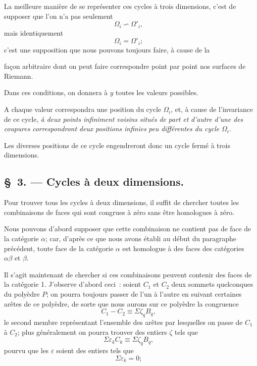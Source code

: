 \documentclass{article}
\begin{document}
La meilleure manière de se représenter ces cycles à trois dimensions, c'est de supposer que l'on n'a pas seulement
\[ \Omega_{i} \backsim \Omega'_{i}, \]
mais identiquement
\[ \Omega_{i} = \Omega'_{i}; \]
c'est une supposition que nous pouvons toujours faire, à cause de la

façon arbitraire dont on peut faire correspondre point par point nos surfaces de Riemann.

Dans ces conditions, on donnera à $y$ toutes les valeurs possibles.

A chaque valeur correspondra une position du cycle $\Omega_{i}$, et, à cause de l'invariance de ce cycle, \emph{à deux points infiniment voisins situés de part et d'autre d'une des coupures correspondront deux positions infinies} \emph{peu différentes du cycle $\Omega_{i}$}.

Les diverses positions de ce cycle engendreront donc un cycle fermé à trois dimensions.

\subsection*{\S~3. --- Cycles à deux dimensions.}

Pour trouver tous les cycles à deux dimensions, il suffit de chercher toutes les combinaisons de faces qui sont congrues à zéro sans être homologues à zéro.

Nous pouvons d'abord supposer que cette combinaison ne contient pas de face de la catégorie $\alpha$; car, d'après ce que nous avons établi au début du paragraphe précédent, toute face de la catégorie $\alpha$ est homologue à des faces des catégories $\alpha\beta$ et $\beta$.

Il s'agit maintenant de chercher si ces combinaisons peuvent contenir des faces de la catégorie 1. J'observe d'abord ceci~: soient $C_{1}$ et $C_{2}$ deux sommets quelconques du polyèdre $P$; on pourra toujours passer de l'un à l'autre en suivant certaines arêtes de ce polyèdre, de sorte que nous aurons sur ce polyèdre la congruence
\[ C_{1} - C_{2} \equiv \Sigma \zeta_{q} B_{q}, \]
le second membre représentant l'ensemble des arêtes par lesquelles on passe de $C_{1}$ à $C_{2}$; plus généralement on pourra trouver des entiers $\zeta$ tels que
\[ \Sigma \varepsilon_{k} C_{k} \equiv \Sigma \zeta_{q} B_{q}, \tag{1} \]
pourvu que les $\varepsilon$ soient des entiers tels que
\[ \Sigma \varepsilon_{k} = 0; \]
\end{document}
